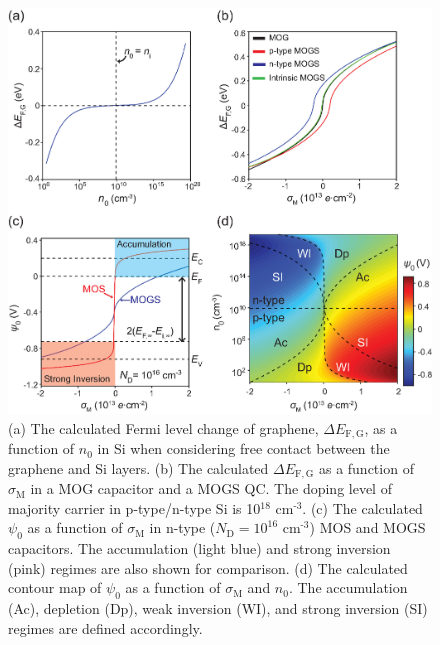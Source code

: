 \documentclass[journal=nalefd]{achemso}
\newcommand*\subs[1]{_{\text{#1}}} %
\newcommand*\sups[1]{^{\text{#1}}} %
\begin{document}
\begin{figure}[htbp]
  \includegraphics[width=0.95\linewidth]{img/FIG2.eps}
  \caption{(a) The calculated Fermi level change of graphene, $\Delta E_{\mathrm {F,G}}$, as a function of $n_0$ in Si when 
  considering free contact between the graphene and Si layers.
  (b) The calculated $\Delta E_{\mathrm {F,G}}$ as a function of $\sigma\subs{M}$ in a MOG 
  capacitor and a MOGS QC. The doping level of majority carrier in p-type/n-type Si is 10$\sups{18}$ cm$\sups{-3}$.
  (c) The calculated $\psi_0$ as a function of $\sigma\subs{M}$ in n-type ($N\subs{D}=10^{16}$ cm$\sups{-3}$) MOS and MOGS capacitors. The accumulation (light blue) and strong inversion (pink) regimes are also shown for comparison.
  (d) The calculated contour map of $\psi_0$ as a function of $\sigma\subs{M}$ and $n_0$. The accumulation (Ac), depletion (Dp), weak inversion (WI), and strong inversion (SI) regimes are defined accordingly.
  }
  \label{fig:fermi-level-change}
\end{figure}
\end{document}
